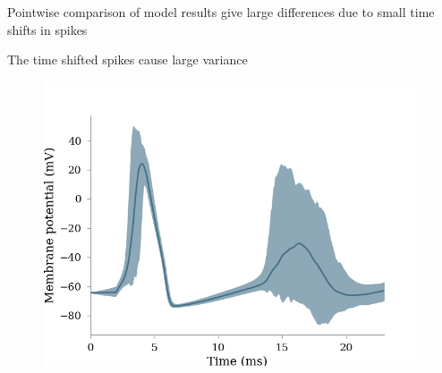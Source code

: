 \documentclass[presentation]{beamer}
\begin{document}
\begin{frame}{Pointwise comparison of model results give large differences
  due to small time shifts in spikes}
\begin{figure}
  \end{figure}

\end{frame}





\begin{frame}{The time shifted spikes cause large variance}
  \vspace{-5mm}
  \begin{figure}
    \includegraphics[height=0.8\textheight]{features_why_prediction.png}
  \end{figure}
\end{frame}
\end{document}
